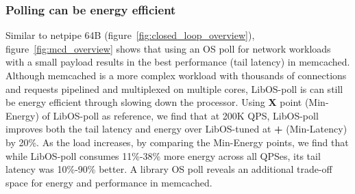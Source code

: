 
\subsubsection{Polling can be energy efficient}
\label{sec:mcd:poll}
Similar to netpipe 64B (figure~\ref{fig:closed_loop_overview}), figure~\ref{fig:mcd_overview} shows that using an OS poll for network workloads with a small payload results in the best performance (tail latency) in memcached. Although memcached is a more complex workload with thousands of connections and requests pipelined and multiplexed on multiple cores, LibOS-poll is can still be energy efficient through slowing down the processor. Using \textbf{X} point (Min-Energy) of LibOS-poll as reference, we find that at 200K QPS, LibOS-poll improves both the tail latency and energy over LibOS-tuned at \textbf{+} (Min-Latency) by 20\%. As the load increases, by comparing the Min-Energy points, we find that while LibOS-poll consumes 11\%-38\% more energy across all QPSes, its tail latency was 10\%-90\% better. A library OS poll reveals an additional trade-off space for energy and performance in memcached.


